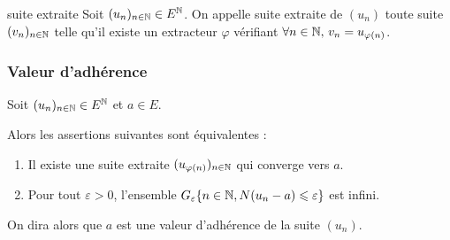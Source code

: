 \begin{definition}{suite extraite}{}
    Soit $(u_n)_{n \in \mathbb{N}} \in E^{\mathbb{N}}$. On appelle suite extraite de $(u_n)$ toute suite 
    $(v_n)_{n \in \mathbb{N}}$ telle qu'il existe un extracteur $\varphi$ vérifiant 
    $\forall n \in \mathbb{N}, \, v_n = u_{\varphi(n)}$.
\end{definition}


\subsubsection{Valeur d'adhérence}

\begin{theorement}{}{}
    Soit $(u_n)_{n \in \mathbb{N}} \in E^{\mathbb{N}}$ et $a \in E$.

    Alors les assertions suivantes sont équivalentes :

    \begin{enumerate}
        \item Il existe une suite extraite $(u_{\varphi(n)})_{n \in \mathbb{N}}$ qui converge 
            vers $a$.
        \item Pour tout $\varepsilon > 0$, l'ensemble 
            $G_\varepsilon\{n \in \mathbb{N}, N(u_n - a) \leqslant \varepsilon\}$ est infini.
    \end{enumerate}

    On dira alors que $a$ est une valeur d'adhérence de la suite $(u_n)$.
\end{theorement}



